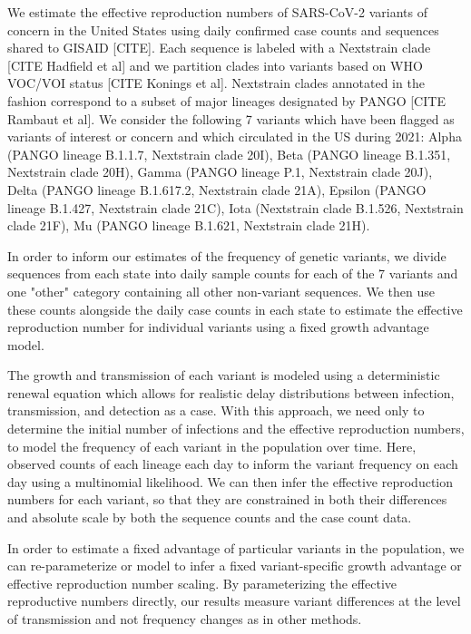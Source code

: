 \documentclass[12pt]{article}
\begin{document}
We estimate the effective reproduction numbers of SARS-CoV-2 variants of concern in the United States using daily confirmed case counts and sequences shared to GISAID [CITE]. %
Each sequence is labeled with a Nextstrain clade [CITE Hadfield et al] and we partition clades into variants based on WHO VOC/VOI status [CITE Konings et al].
Nextstrain clades annotated in the fashion correspond to a subset of major lineages designated by PANGO [CITE Rambaut et al].
We consider the following 7 variants which have been flagged as variants of interest or concern and which circulated in the US during 2021: Alpha (PANGO lineage B.1.1.7, Nextstrain clade 20I), Beta (PANGO lineage B.1.351, Nextstrain clade 20H), Gamma (PANGO lineage P.1, Nextstrain clade 20J), Delta (PANGO lineage B.1.617.2, Nextstrain clade 21A), Epsilon (PANGO lineage B.1.427, Nextstrain clade 21C), Iota (Nextstrain clade B.1.526, Nextstrain clade 21F), Mu (PANGO lineage B.1.621, Nextstrain clade 21H).

In order to inform our estimates of the frequency of genetic variants, we divide sequences from each state into daily sample counts for each of the 7 variants and one "other" category containing all other non-variant sequences.
We then use these counts alongside the daily case counts in each state to estimate the effective reproduction number for individual variants using a fixed growth advantage model.

The growth and transmission of each variant is modeled using a deterministic renewal equation which allows for realistic delay distributions between infection, transmission, and detection as a case.
With this approach, we need only to determine the initial number of infections and the effective reproduction numbers, to model the frequency of each variant in the population over time.
Here, observed counts of each lineage each day to inform the variant frequency on each day using a multinomial likelihood.
We can then infer the effective reproduction numbers for each variant, so that they are constrained in both their differences and absolute scale by both the sequence counts and the case count data.

In order to estimate a fixed advantage of particular variants in the population, we can re-parameterize or model to infer a fixed variant-specific growth advantage or effective reproduction number scaling.
By parameterizing the effective reproductive numbers directly, our results measure variant differences at the level of transmission and not frequency changes as in other methods.
\end{document}
